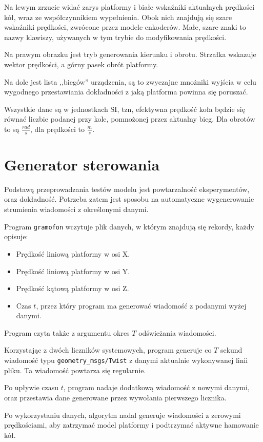 		Na lewym zrzucie widać zarys platformy i białe wskaźniki aktualnych prędkości kół, wraz ze współczynnikiem wypełnienia.
		Obok nich znajdują się szare wskaźniki prędkości, zwrócone przez modele enkoderów.
		Małe, szare znaki to nazwy klawiszy, używanych w tym trybie do modyfikowania prędkości.
		
		Na prawym obrazku jest tryb generowania kierunku i obrotu. Strzałka wskazuje wektor prędkości, a górny pasek obrót platformy.
		
		Na dole jest lista ,,biegów'' urządzenia, są to zwyczajne mnożniki wyjścia w celu wygodnego przestawiania dokładności z jaką platforma powinna się poruszać.
		
		Wszystkie dane są w jednostkach SI, tzn, efektywna prędkość koła będzie się równać liczbie podanej przy kole, pomnożonej przez aktualny bieg.
		Dla obrotów to są $\frac{rad}{s}$, dla prędkości to $\frac{m}{s}$.
		
\section{Generator sterowania}
	\label{sec:gramofon}
	Podstawą przeprowadzania testów modelu jest powtarzalność eksperymentów, oraz dokładność.
	Potrzeba zatem jest sposobu na automatyczne wygenerowanie strumienia wiadomości z określonymi danymi.
	
	Program \texttt{gramofon} wczytuje plik danych, w którym znajdują się rekordy, każdy opisuje:
	\begin{itemize}
		\item Prędkość liniową platformy w osi X.
		\item Prędkość liniową platformy w osi Y.
		\item Prędkość kątową platformy w osi Z.
		\item Czas $t$, przez który program ma generować wiadomość z podanymi wyżej danymi.
	\end{itemize}
	Program czyta także z argumentu okres $T$ odświeżania wiadomości.
	
	Korzystając z dwóch liczników systemowych, program generuje co $T$ sekund wiadomość typu \texttt{geometry\_msgs/Twist} z danymi aktualnie wykonywanej linii pliku.
	Ta wiadomość powtarza się regularnie.
	
	Po upływie czasu $t$, program nadaje dodatkową wiadomość z nowymi danymi, oraz przestawia dane generowane przez wywołania pierwszego licznika.
	
	Po wykorzystaniu danych, algorytm nadal generuje wiadomości z zerowymi prędkościami, aby zatrzymać model platformy i podtrzymać aktywne hamowanie kół.
	
